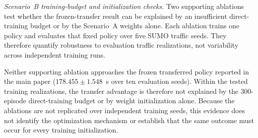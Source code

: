 \documentclass[12pt]{article}
\begin{document}
\textit{Scenario~B training-budget and initialization checks.}
Two supporting ablations test whether the frozen-transfer result can be
explained by an insufficient direct-training budget or by the Scenario~A
weights alone. Each ablation trains one policy and evaluates that fixed policy
over five SUMO traffic seeds. They therefore quantify robustness to evaluation
traffic realizations, not variability across independent training runs.

\begin{table}[H]
\centering
\caption*{\textbf{Table S1A:} Five-seed fixed-policy evaluations of the
Scenario~B training-budget and initialization ablations. The waiting-time
confidence intervals are percentile-bootstrap 95\% intervals over the five
evaluation seeds. Gaps use the ten-seed Scenario~B optimized-offset mean
of $172.097$~s as a fixed reference and are therefore not paired per-seed
gap estimates.}
\small
\setlength{\tabcolsep}{3.5pt}
\end{table}

Neither supporting ablation approaches the frozen transferred policy
reported in the main paper ($178.455\pm1.548$~s over ten evaluation
seeds). Within the tested training realizations, the transfer advantage is
therefore not explained by the 300-episode direct-training budget or by
weight initialization alone. Because the ablations are not replicated over
independent training seeds, this evidence does not identify the optimization
mechanism or establish that the same outcome must occur for every training
initialization.
\end{document}
